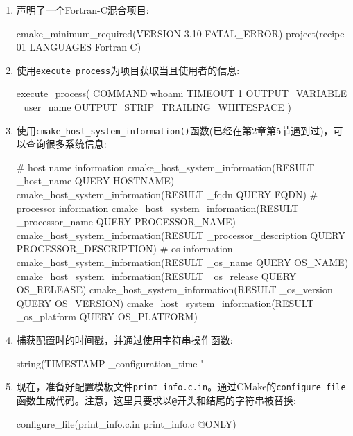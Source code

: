 \begin{enumerate}
\item 声明了一个Fortran-C混合项目:

\begin{codebox}[cmake]
cmake_minimum_required(VERSION 3.10 FATAL_ERROR)
project(recipe-01 LANGUAGES Fortran C)
\end{codebox}

\item 使用\texttt{execute\_process}为项目获取当且使用者的信息:

\begin{codebox}[cmake]
execute_process(
  COMMAND
    whoami
  TIMEOUT
    1
  OUTPUT_VARIABLE
    _user_name
  OUTPUT_STRIP_TRAILING_WHITESPACE
  )
\end{codebox}

\item 使用\texttt{cmake\_host\_system\_information()}函数(已经在第2章第5节遇到过)，可以查询很多系统信息:

\begin{codebox}[cmake]
# host name information
cmake_host_system_information(RESULT _host_name QUERY HOSTNAME)
cmake_host_system_information(RESULT _fqdn QUERY FQDN)
# processor information
cmake_host_system_information(RESULT _processor_name QUERY PROCESSOR_NAME)
cmake_host_system_information(RESULT _processor_description QUERY PROCESSOR_DESCRIPTION)
# os information
cmake_host_system_information(RESULT _os_name QUERY OS_NAME)
cmake_host_system_information(RESULT _os_release QUERY OS_RELEASE)
cmake_host_system_information(RESULT _os_version QUERY OS_VERSION)
cmake_host_system_information(RESULT _os_platform QUERY OS_PLATFORM)
\end{codebox}

\item 捕获配置时的时间戳，并通过使用字符串操作函数:

\begin{codebox}[cmake]
string(TIMESTAMP _configuration_time "%
\end{codebox}

\item 现在，准备好配置模板文件\texttt{print\_info.c.in}。通过CMake的\texttt{configure\_file}函数生成代码。注意，这里只要求以\texttt{@}开头和结尾的字符串被替换:

\begin{codebox}[cmake]
configure_file(print_info.c.in print_info.c @ONLY)
\end{codebox}


\end{enumerate}
